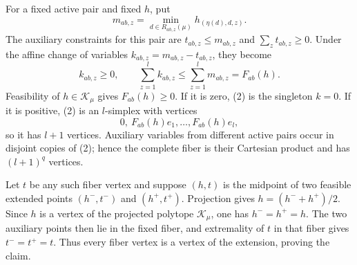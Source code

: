 For a fixed active pair and fixed \(h\), put
\[m_{ab,z}=\min_{d\in R_{ab,z}(\mu)}h_{(\eta(d),d,z)}.\tag{1}\]
The auxiliary constraints for this pair are \(t_{ab,z}\le m_{ab,z}\) and \(\sum_zt_{ab,z}\ge0\). Under the affine change of variables \(k_{ab,z}=m_{ab,z}-t_{ab,z}\), they become
\[k_{ab,z}\ge0,\qquad \sum_{z=1}^lk_{ab,z}\le\sum_{z=1}^lm_{ab,z}=F_{ab}(h).\tag{2}\]
Feasibility of \(h\in\mathcal K_\mu\) gives \(F_{ab}(h)\ge0\). If it is zero, (2) is the singleton \(k=0\). If it is positive, (2) is an \(l\)-simplex with vertices
\[0,\ F_{ab}(h)e_1,\ldots,F_{ab}(h)e_l,\tag{3}\]
so it has \(l+1\) vertices. Auxiliary variables from different active pairs occur in disjoint copies of (2); hence the complete fiber is their Cartesian product and has \((l+1)^q\) vertices.

Let \(t\) be any such fiber vertex and suppose \((h,t)\) is the midpoint of two feasible extended points \((h^-,t^-)\) and \((h^+,t^+)\). Projection gives \(h=(h^-+h^+)/2\). Since \(h\) is a vertex of the projected polytope \(\mathcal K_\mu\), one has \(h^-=h^+=h\). The two auxiliary points then lie in the fixed fiber, and extremality of \(t\) in that fiber gives \(t^-=t^+=t\). Thus every fiber vertex is a vertex of the extension, proving the claim.